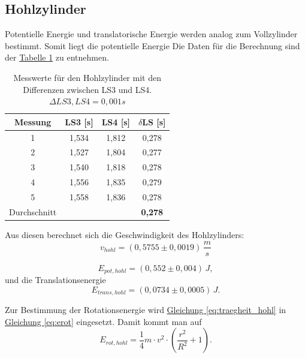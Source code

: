\subsection*{Hohlzylinder}
Potentielle Energie und translatorische Energie werden analog zum Vollzylinder bestimmt. Somit liegt die potentielle Energie
Die Daten für die Berechnung sind der \hyperref[tab:hohlzylinder_ls]{Tabelle \ref*{tab:hohlzylinder_ls}} zu entnehmen.

\begin{table}[!ht]
    \centering
    \begin{tabular}{c | c | c | c}
    \toprule
    Messung & LS3 [s] & LS4 [s] & $\delta$LS [s] \\
    \hline
    1 & 1,534 & 1,812 & 0,278 \\
    2 & 1,527 & 1,804 & 0,277 \\
    3 & 1,540 & 1,818 & 0,278 \\
    4 & 1,556 & 1,835 & 0,279 \\
    5 & 1,558 & 1,836 & 0,278 \\
    \hline
    Durchschnitt &     &     & \textbf{0,278} \\
    \bottomrule
    \end{tabular}
    \caption{Messwerte für den Hohlzylinder mit den Differenzen zwischen LS3 und LS4. $\Delta LS3,LS4 = 0,001s$}
    \label{tab:hohlzylinder_ls}
\end{table}


Aus diesen berechnet sich die Geschwindigkeit des Hohlzylinders:
\begin{equation}
\boxed{
    v_{hohl} = (0,5755 \pm 0,0019) \, \frac{m}{s}
}
\end{equation}

\begin{equation}
\boxed{
    E_{pot,hohl} = (0,552 \pm 0,004) \, J
},
\end{equation}
und die Translationsenergie
\begin{equation}
\boxed{
    E_{trans,hohl} = (0,0734 \pm 0,0005) \, J
}.
\end{equation}

Zur Bestimmung der Rotationsenergie wird \hyperref[eq:traegheit_hohl]{Gleichung \ref*{eq:traegheit_hohl}} in \hyperref[eq:erot]{Gleichung \ref*{eq:erot}} eingesetzt. Damit kommt man auf
\begin{equation}
    E_{rot,hohl} = \frac{1}{4} m \cdot v^2 \cdot \left(\frac{r^2}{R^2} + 1\right).
\end{equation}

